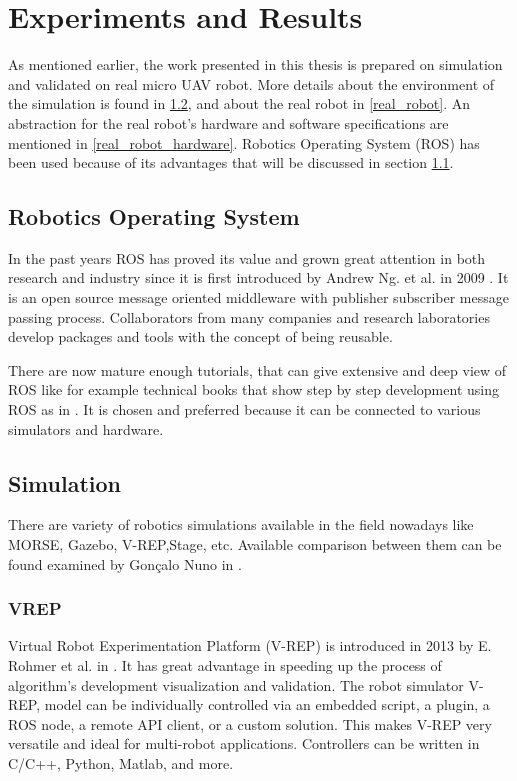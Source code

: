 \chapter{Experiments and Results} \label{experiment_reuslts}

As mentioned earlier, the work presented in this thesis is prepared on simulation and validated on real micro UAV robot. More details about the environment of the simulation is found in \ref{simu}, and about the real robot in \ref{real_robot}. An abstraction for the real robot's hardware and software specifications are mentioned in \ref{real_robot_hardware}. Robotics Operating System (ROS) has been used because of its advantages that will be discussed in section \ref{ROS_part}.

\section{Robotics Operating System} \label{ROS_part}
In the past years ROS has proved its value and grown great attention in both research and industry since it is first introduced by Andrew Ng. et al. in 2009 \cite{quigley2009ros}. It is an open source message oriented middleware with publisher subscriber message passing process. Collaborators from many companies and research laboratories develop packages and tools with the concept of being reusable. 



There are now mature enough tutorials, that can give extensive and deep view of ROS like for example technical books that show step by step development using ROS as in \cite{o2014gentle,joseph2015mastering}. It is chosen and preferred because it can be connected to various simulators and hardware.



\section{Simulation} \label{simu}
There are variety of robotics simulations available in the field nowadays like MORSE, Gazebo, V-REP,Stage, etc. Available comparison between them can be found examined by Gonçalo Nuno in \cite{augusto2013robotteamsim}.
\vfill
\hfill

\subsection{VREP}
Virtual Robot Experimentation Platform (V-REP) is introduced in 2013 by E. Rohmer et al. in \cite{rohmer2013v}. It has great advantage in speeding up the process of algorithm's development visualization and validation. The robot simulator V-REP, model can be individually controlled via an embedded script, a plugin, a ROS node, a remote API client, or a custom solution. This makes V-REP very versatile and ideal for multi-robot applications. Controllers can be written in C/C++, Python, Matlab, and more.
\vfill
\hfill

